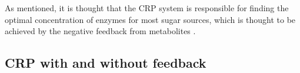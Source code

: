 %
As mentioned, it is thought that the CRP system is responsible for finding the optimal concentration of enzymes for most sugar sources,
which is thought to be achieved by the negative feedback from metabolites \cite{Towbin2017}.
%


\subsection{CRP with and without feedback}


